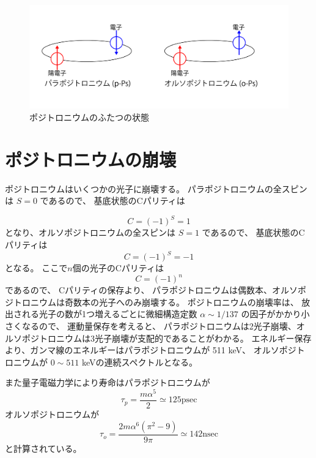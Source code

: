 \begin{figure}[H]
\centering
\includegraphics[keepaspectratio, scale=0.4]{fig/ybm/Ps.pdf}
\caption{ポジトロニウムのふたつの状態}
\label{fig:Ps}
\end{figure}


\section{ポジトロニウムの崩壊}

ポジトロニウムはいくつかの光子に崩壊する。
パラポジトロニウムの全スピンは $S=0$ であるので、
基底状態のCパリティは

\begin{equation}
C = (-1)^{S} = 1
\end{equation}
となり、オルソポジトロニウムの全スピンは $S=1$ であるので、
基底状態のCパリティは
\begin{equation}
C = (-1)^{S} = -1
\end{equation}
となる。
ここで$n$個の光子のCパリティは
\begin{equation}
C = (-1)^{n}
\end{equation}
であるので、
Cパリティの保存より、
パラポジトロニウムは偶数本、オルソポジトロニウムは奇数本の光子へのみ崩壊する。
ポジトロニウムの崩壊率は、
放出される光子の数が1つ増えるごとに微細構造定数 $\alpha \sim 1/137$ の因子がかかり小さくなるので、
運動量保存を考えると、
パラポジトロニウムは2光子崩壊、オルソポジトロニウムは3光子崩壊が支配的であることがわかる。
エネルギー保存より、ガンマ線のエネルギーはパラポジトロニウムが 511 keV、
オルソポジトロニウムが $0 \sim 511$  keVの連続スペクトルとなる。

また量子電磁力学により寿命はパラポジトロニウムが
\begin{equation}
\tau_{p} = \frac{m \alpha^{5}}{2} \simeq 125 \mathrm{psec}
\end{equation}
オルソポジトロニウムが
\begin{equation}
\tau_{o} = \frac{2m \alpha^{6}(\pi^{2}-9)}{9 \pi} \simeq 142 \mathrm{nsec}
\end{equation}
と計算されている。


